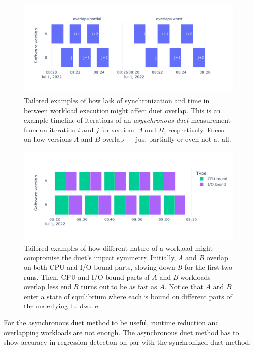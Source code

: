 \begin{figure}[!ht]
	\centering
	\includegraphics[width=.9\linewidth]{./figures/overlap_timeline.pdf}
	\caption{
		Tailored examples of how lack of synchronization and time in between workload execution might affect duet overlap.
		This is an example timeline of iterations of an \emph{asynchronous duet} measurement from an iteration $i$ and $j$ for versions $A$ and $B$, respectively.
		Focus on how versions $A$ and $B$ overlap --- just partially or even not at all.
	}
	\label{fig:overlap_timeline}
\end{figure}

\begin{figure}[!ht]
	\centering
	\includegraphics[width=.9\linewidth]{./figures/overlap_interference.pdf}
	\caption{
		Tailored examples of how different nature of a workload might compromise the duet's impact symmetry.
		Initially, $A$ and $B$ overlap on both CPU and I/O bound parts, slowing down $B$ for the first two runs.
		Then, CPU and I/O bound parts of $A$ and $B$ workloads overlap less end $B$ turns out to be as fast as $A$.
		Notice that $A$ and $B$ enter a state of equilibrium where each is bound on different parts of the underlying hardware.
	}
	\label{fig:overlap_interference}
\end{figure}

For the asynchronous duet method to be useful, runtime reduction and overlapping workloads are not enough.
The asynchronous duet method has to show accuracy in regression detection on par with the synchronized duet method:

